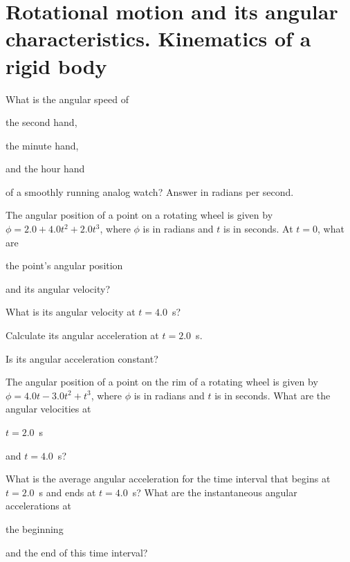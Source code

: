 \section{Rotational motion and its angular characteristics. Kinematics of a rigid body}


\begin{problem}
	What is the angular speed of 
	\begin{enumerate*}[label = (\alph*)]
		\item the second hand,
		\item the minute hand,
		\item and the hour hand
	\end{enumerate*}	
of a smoothly running analog watch? Answer in radians per second.
\end{problem}


\begin{problem}
	The angular position of a point on a rotating wheel is given
	by $\phi = 2.0 + 4.0t^2 + 2.0t^3$, where $\phi$ is in radians and $t$ is in seconds. At
	$t = 0$, what are 
	\begin{enumerate*}[label = (\alph*)]
		\item the point’s angular position
		\item and its angular velocity?
		\item What is its angular velocity at $t = 4.0$~s?
		\item Calculate its angular acceleration at $t = 2.0$~s.
		\item Is its angular acceleration constant?
	\end{enumerate*}
\end{problem}


\begin{problem}
	The angular position of a point on the rim of a rotating wheel is
	given by $\phi = 4.0t - 3.0t^2 + t^3$, where $\phi$ is in radians and $t$ is in seconds.
	What are the angular velocities at 
	\begin{enumerate*}[label = (\alph*)]
		\item $t = 2.0$~s
		\item and $t = 4.0$~s?
		\item What is the average angular acceleration for the time interval that begins at $t = 2.0$~s and ends at $t = 4.0$~s?
		What are the instantaneous angular accelerations at
		\item the beginning
		\item and the end of this time interval?
	\end{enumerate*}
\end{problem}


